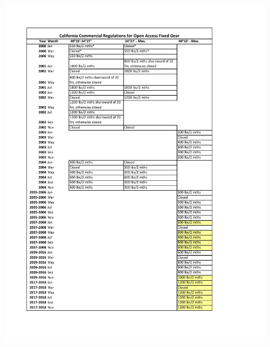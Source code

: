 \documentclass[12pt,]{article}
\begin{document}
\begin{figure}
\centering
\includegraphics{Figures/Comm_regs1.pdf}
\caption{\label{fig:Comm_regs1}}
\end{figure}

\FloatBarrier
\end{document}
